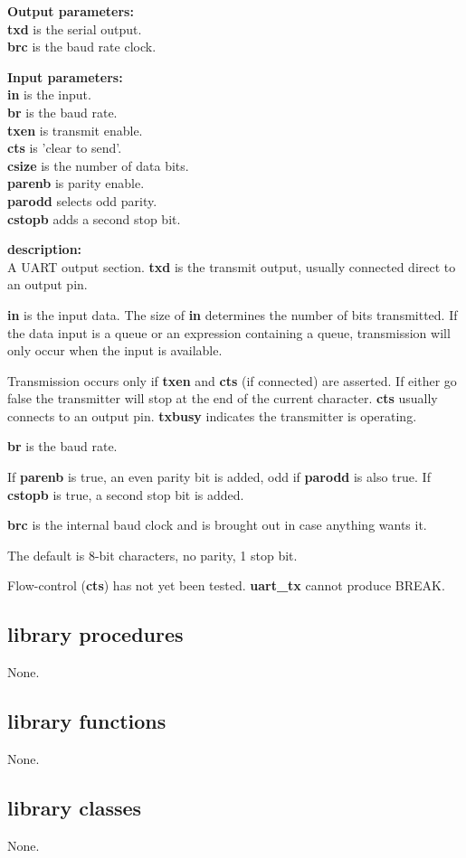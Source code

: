             {\bf Output parameters:} \\
            {\bf txd} is the serial output.\\
            {\bf brc} is the baud rate clock.

            {\bf Input parameters:} \\
            {\bf in} is the input.\\
            {\bf br} is the baud rate.\\
            {\bf txen} is transmit enable.\\
            {\bf cts} is 'clear to send'.\\
            {\bf csize} is the number of data bits.\\
            {\bf parenb} is parity enable.\\
            {\bf parodd} selects odd parity.\\
            {\bf cstopb} adds a second stop bit.

            {\bf description:} \\
            A UART output section. {\bf txd} is the transmit output, usually
            connected direct to an output pin.

            {\bf in} is the input data. The size of {\bf in} determines the
            number of bits transmitted. If the data input is a queue or an
            expression containing a queue, transmission will only occur when the
            input is available.

            Transmission occurs only if {\bf txen} and {\bf cts} (if connected)
            are asserted. If either go false the transmitter will stop at the
            end of the current character. {\bf cts} usually connects to an
            output pin. {\bf txbusy} indicates the transmitter is operating.

            {\bf br} is the baud rate.
            
            If {\bf parenb} is true, an even parity bit is added, odd if {\bf
            parodd} is also true. If {\bf cstopb} is true, a second stop bit is
            added.

            {\bf brc} is the internal baud clock and is brought out in case
            anything wants it.

            The default is 8-bit characters, no parity, 1 stop bit.

            Flow-control ({\bf cts}) has not yet been tested. {\bf uart\_tx}
            cannot produce BREAK.


    \subsection{library procedures}
    
        None.
        


    \subsection{library functions}
    
        None.


    \subsection{library classes}
    
        None.
